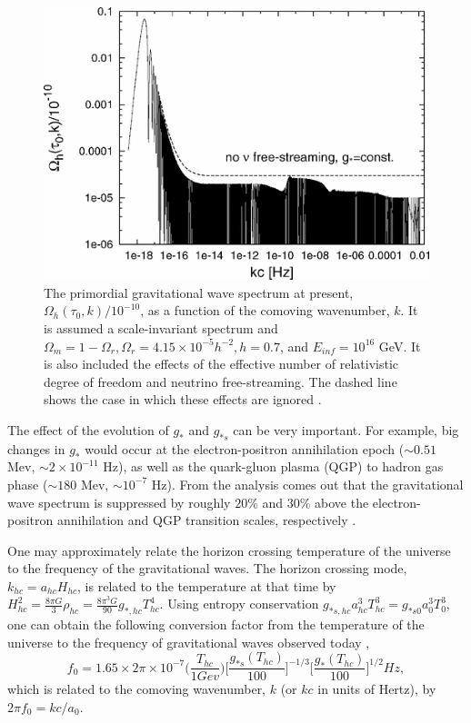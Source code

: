 \documentclass[11pt,a4paper,twoside]{book}
\begin{document}
\begin{figure}
	\centering
	\includegraphics[width=0.7\linewidth, height=0.25\textheight]{Images/Chap3/Watanabe_Komatsu_Fig4}
	\caption{The primordial gravitational wave spectrum at present, $\Omega_{h}(\tau_{0},k)/10^{-10}$, as a function of the comoving wavenumber, $ k $. It is assumed a scale-invariant spectrum and $\Omega_{m}=1-\Omega_{r}, \Omega_{r} = 4.15 \times 10^{-5} h^{-2}, h=0.7$, and $ E_{inf}=10^{16} $ GeV. It is also included the effects of the effective number of relativistic degree of freedom and neutrino free-streaming. The dashed line shows the case in which these effects are ignored \cite{Chap3:GW_Watanabe_Komatsu}.}
	\label{fig:watanabekomatsufig4}
\end{figure}
The effect of the evolution of $ g_{*} $ and $ g_{*s} $ can be very important. For example, big changes in  $ g_{*} $ would occur at the electron-positron annihilation epoch ($\sim 0.51$ Mev, $\sim 2 \times 10^{-11}$ Hz), as well as the quark-gluon plasma (QGP) to hadron gas phase  ($\sim 180$ Mev, $\sim 10^{-7}$ Hz). From the analysis comes out that the gravitational wave spectrum is suppressed by roughly $ 20\% $ and $ 30\% $ above the electron-positron annihilation and QGP transition scales, respectively \cite{Chap3:GW_Watanabe_Komatsu}.

One may approximately relate the horizon crossing temperature of the universe to the frequency of the gravitational waves.  The horizon crossing mode, $ k_{hc} = a_{hc}H_{hc} $, is related to the temperature at that time by $ H^{2}_{hc}=\frac{8\pi G}{3}\rho_{hc}=\frac{8\pi^{3}G}{90}g_{*,hc}T^{4}_{hc} $. Using entropy conservation $ g_{*s,hc}a^{3}_{hc}T^{3}_{hc} = g_{*s0}a_{0}^{3}T_{0}^{3} $, one can obtain the following conversion factor  from the temperature of the universe to the frequency of gravitational waves observed today \cite{Chap3:Kamionkowsy_Turner},
\begin{equation}
		\label{Chap3:frequencyTodayGW}
		f_{0} = 1.65 \times 2\pi \times 10^{-7} \Big(\frac{T_{hc}}{1 Gev}\Big) \Big [\frac{g_{*s}(T_{hc})}{100}\Big]^{-1/3}  \Big [\frac{g_{*}(T_{hc})}{100}\Big]^{1/2} Hz ,
\end{equation}
 which is related to the comoving wavenumber, $ k $ (or $ kc $ in units of Hertz),  by $ 2\pi f_{0} = kc/a_{0} $.
 
\end{document}
